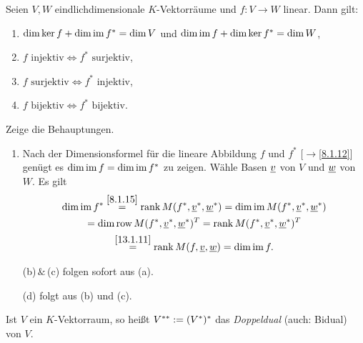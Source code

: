 \documentclass[../../main.tex]{subfiles}
\begin{document}
\begin{pro}\label{13.1.12}
	Seien $V,W$ eindlichdimensionale $K$-Vektorräume und $f: V\to W$ linear. Dann gilt:	
	\begin{enumerate}[\normalfont(a)]
		\item $\dim \ker f+\dim \operatorname{im} f^*=\dim V$ und $\dim \operatorname{im} f+\dim\ker f^*=\dim W$,
		\item $f\text{ injektiv}\Longleftrightarrow f^*\text{ surjektiv}$,
		\item $f\text{ surjektiv}\Longleftrightarrow f^*\text{ injektiv}$,
		\item $f\text{ bijektiv}\Longleftrightarrow f^*\text{ bijektiv}$.
	\end{enumerate}
\end{pro}
\begin{cproof}
	Zeige die Behauptungen.
	\begin{enumerate}[\normalfont(a)]
		\item Nach der Dimensionsformel für die lineare Abbildung $f$ und $f^*$ [$\to$\ref{8.1.12}] genügt es $\dim \operatorname{im} f=\dim \operatorname{im} f^*$ zu zeigen. Wähle Basen ${\underline v}$ von $V$ und ${\underline w}$ von $W$. Es gilt 
		\begin{multline*}
			\dim \operatorname{im} f^* \stackrel{\ref{8.1.15}}{=}\operatorname{rank} M(f^*,\underline{v}^*,\underline{w}^*)=\dim\operatorname{im} M(f^*,\underline{v}^*,\underline{w}^*)\\
			=\dim\operatorname{row} M(f^*,\underline{v}^*,\underline{w}^*)^T=\operatorname{rank} M(f^*,\underline{v}^*,\underline{w}^*)^T\\
			\stackrel{\ref{13.1.11}}{=}\operatorname{rank} M(f,\underline{v},\underline{w})=\dim\operatorname{im} f.
		\end{multline*}
		\item[(b)$\,\&\,$(c)] folgen sofort aus (a).
		\item[(d)] folgt aus (b) und (c).
	\end{enumerate} 
\end{cproof}

\begin{df}\label{13.1.13}
	Ist $V$ ein $K$-Vektorraum, so heißt $V^{**}:=(V^*)^*$ das \emph{Doppeldual} (auch: Bidual) von $V$.
\end{df}
\end{document}
